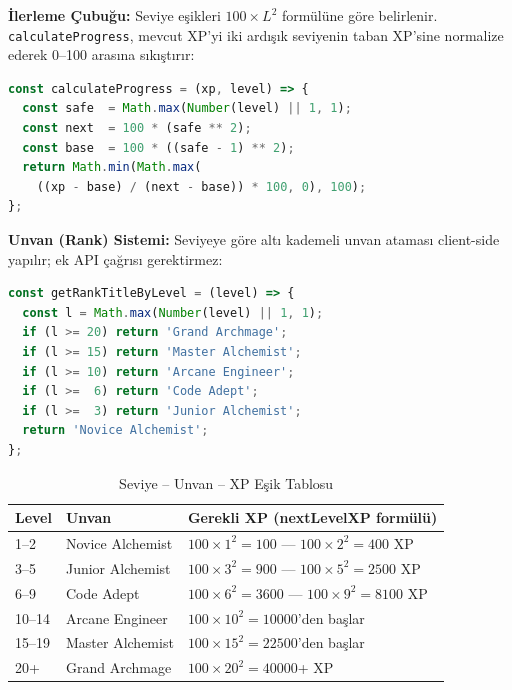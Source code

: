 \documentclass[12pt,a4paper]{article}
\begin{document}
\textbf{İlerleme Çubuğu:} Seviye eşikleri $100 \times L^2$ formülüne göre belirlenir. \texttt{calculateProgress}, mevcut XP'yi iki ardışık seviyenin taban XP'sine normalize ederek 0--100 arasına sıkıştırır:

\begin{lstlisting}[language=JavaScript, caption=GamificationPanel.jsx -- XP İlerleme Hesabı (satır 41--47)]
const calculateProgress = (xp, level) => {
  const safe  = Math.max(Number(level) || 1, 1);
  const next  = 100 * (safe ** 2);
  const base  = 100 * ((safe - 1) ** 2);
  return Math.min(Math.max(
    ((xp - base) / (next - base)) * 100, 0), 100);
};
\end{lstlisting}

\textbf{Unvan (Rank) Sistemi:} Seviyeye göre altı kademeli unvan ataması client-side yapılır; ek API çağrısı gerektirmez:

\begin{lstlisting}[language=JavaScript, caption=GamificationPanel.jsx -- Rank Haritalama (satır 49--57)]
const getRankTitleByLevel = (level) => {
  const l = Math.max(Number(level) || 1, 1);
  if (l >= 20) return 'Grand Archmage';
  if (l >= 15) return 'Master Alchemist';
  if (l >= 10) return 'Arcane Engineer';
  if (l >=  6) return 'Code Adept';
  if (l >=  3) return 'Junior Alchemist';
  return 'Novice Alchemist';
};
\end{lstlisting}

\begin{table}[h!]
  \centering\small
  \begin{tabular}{@{} P{2cm} P{4cm} P{7.5cm} @{}}
    \toprule
    \textbf{Level} & \textbf{Unvan} & \textbf{Gerekli XP (nextLevelXP formülü)} \\
    --2  & Novice Alchemist  & $100 \times 1^2 = 100$ --- $100 \times 2^2 = 400$ XP \\
    3--5  & Junior Alchemist  & $100 \times 3^2 = 900$ --- $100 \times 5^2 = 2500$ XP \\
    6--9  & Code Adept        & $100 \times 6^2 = 3600$ --- $100 \times 9^2 = 8100$ XP \\
    10--14 & Arcane Engineer  & $100 \times 10^2 = 10000$'den başlar \\
    15--19 & Master Alchemist & $100 \times 15^2 = 22500$'den başlar \\
    20+   & Grand Archmage    & $100 \times 20^2 = 40000$+ XP \\
    \bottomrule
  \end{tabular}
  \caption{Seviye -- Unvan -- XP Eşik Tablosu}
\end{table}
\end{document}
